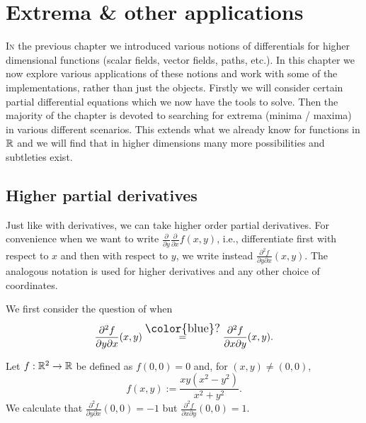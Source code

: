 \chapter{Extrema \& other applications}
\bookletstart

\lettrine{I}{n} the previous chapter we introduced various notions of differentials for higher dimensional functions (scalar fields, vector fields, paths, etc.).
In this chapter we now explore various applications of these notions and work with some of the implementations, rather than just the objects.
Firstly we will consider certain partial differential equations which we now have the tools to solve.
Then the majority of the chapter is devoted to searching for extrema (minima / maxima) in various different scenarios.
This extends what we already know for functions in \(\mathbb{R}\) and we will find that in higher dimensions many more possibilities and subtleties exist.

\section{Higher partial derivatives}
Just like with derivatives, we can take higher order partial derivatives.
For convenience when we want to write \(\frac{\partial}{\partial y}\frac{\partial}{\partial x}f(x,y) \), i.e., differentiate first with respect to \(x\) and then with respect to \(y\), we write instead \(\frac{\partial^2 f}{\partial y \partial x}(x,y) \).
The analogous notation is used for higher derivatives and any other choice of coordinates.

We first consider the question of when
\[
    \frac{\partial^2 f}{\partial y \partial x}(x,y)
    \overset{\text{\large\color{blue}?}}{=}
    \frac{\partial^2 f}{\partial x \partial y}(x,y).
\]

\begin{example*}
    Let \(f:\mathbb{R}^2 \to \mathbb{R}\) be defined as \(f(0,0)=0\) and, for \((x,y)\neq (0,0)\),
    \[
        f(x,y) := \frac{x y(x^2 - y^2)}{x^2 + y^2}.
    \]
    We calculate that \(\frac{\partial^2 f}{\partial y \partial x} (0,0) = -1\) but
    \(\frac{\partial^2 f}{\partial x \partial y}(0,0) = 1\).
\end{example*}

